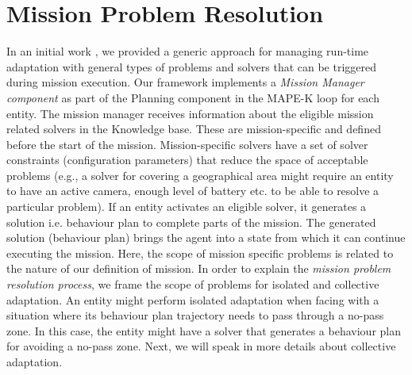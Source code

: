 \documentclass[journal]{IEEEtran}
\theoremstyle{definition}
\newcommand\darko[1]{\nb{Darko}{#1}}
\begin{document}
\section{Mission Problem Resolution}

 
 

 
 
 

 
In an initial work \cite{bozhinoski2016leveraging}, we provided a generic approach for managing run-time adaptation with general types of problems and solvers that can be triggered during mission execution.
Our framework implements a \textit{Mission Manager component} as part of the Planning component in the MAPE-K loop for each entity. 
 The mission manager receives information about the eligible mission related solvers in the Knowledge base. These are mission-specific and defined before the start of the mission. Mission-specific solvers have a set of solver constraints (configuration parameters) that reduce the space of acceptable problems (e.g., a solver for covering a geographical area might require an entity to have an active camera, enough level of battery etc. to be  able to resolve a particular problem).  If an entity %
 activates an eligible solver, it generates a solution i.e. behaviour plan to complete parts of the mission.
 The generated solution (behaviour plan) brings the agent into a state from which it can continue executing the mission.
 Here, the scope of mission specific problems is related to the nature of our definition of mission. In order to explain the \textit{mission problem resolution process}, we frame the scope of problems for isolated and collective adaptation.
 An entity might perform isolated adaptation when facing with a situation where its behaviour plan trajectory needs to pass through a no-pass zone. In this case, the entity might have a solver that generates a behaviour plan for avoiding a no-pass zone. Next, we will speak in more details about collective adaptation.
\end{document}
